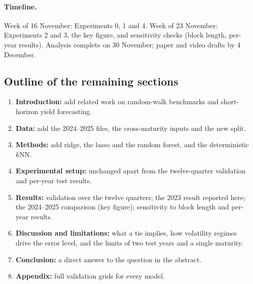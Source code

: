 \documentclass{article}
\begin{document}
\paragraph{Timeline.} Week of 16 November: Experiments 0, 1 and 4. Week of 23 November: Experiments 2 and 3, the key figure, and sensitivity checks (block length, per-year results). Analysis complete on 30 November; paper and video drafts by 4 December.

\subsection{Outline of the remaining sections}
\begin{enumerate}[leftmargin=*,itemsep=2pt]
  \item \textbf{Introduction:} add related work on random-walk benchmarks and short-horizon yield forecasting.
  \item \textbf{Data:} add the 2024--2025 files, the cross-maturity inputs and the new split.
  \item \textbf{Methods:} add ridge, the lasso and the random forest, and the deterministic $k$NN.
  \item \textbf{Experimental setup:} unchanged apart from the twelve-quarter validation and per-year test results.
  \item \textbf{Results:} validation over the twelve quarters; the 2023 result reported here; the 2024--2025 comparison (key figure); sensitivity to block length and per-year results.
  \item \textbf{Discussion and limitations:} what a tie implies, how volatility regimes drive the error level, and the limits of two test years and a single maturity.
  \item \textbf{Conclusion:} a direct answer to the question in the abstract.
  \item \textbf{Appendix:} full validation grids for every model.
\end{enumerate}
\end{document}
